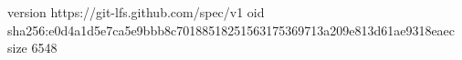 version https://git-lfs.github.com/spec/v1
oid sha256:e0d4a1d5e7ca5e9bbb8c70188518251563175369713a209e813d61ae9318eaec
size 6548

